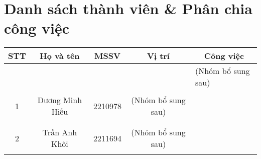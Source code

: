\section{Danh sách thành viên \& Phân chia công việc}
\renewcommand{\arraystretch}{1.4}
\begin{table}[H]
\begin{tabular}{|c|c|c|c|l|}
\hline
\rowcolor[HTML]{EFEFEF} 
\textbf{STT}        & \textbf{Họ và tên}                        & \textbf{MSSV}                     & \textbf{Vị trí}                                           & \multicolumn{1}{c|}{\cellcolor[HTML]{EFEFEF}\textbf{Công việc}}   \\ \hline
                    &                                           &                                   &                                                           & (Nhóm bổ sung sau)                                                \\ \cline{5-5} 
                    &                                           &                                   &                                                           &                                                                   \\ \cline{5-5} 
\multirow{-3}{*}{1} & \multirow{-3}{*}{Dương Minh Hiếu}         & \multirow{-3}{*}{2210978}         & \multirow{-3}{*}{(Nhóm bổ sung sau)}                      &                                                                   \\ \hline
                    &                                           &                                   &                                                           &                                                                   \\ \cline{5-5} 
                    &                                           &                                   &                                                           &                                                                   \\ \cline{5-5} 
\multirow{-3}{*}{2} & \multirow{-3}{*}{Trần Anh Khôi}           & \multirow{-3}{*}{2211694}         & \multirow{-3}{*}{(Nhóm bổ sung sau)}                      &                                                                   \\ \hline
                    &                                           &                                   &                                                           &                                                                   \\ \cline{5-5} 

\end{tabular}
\end{table}
